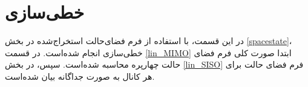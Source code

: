 \section{خطی‌سازی}
در این قسمت، با استفاده از فرم فضای‌حالت استخراج‌شده در بخش 
\ref{spacestate}،
 خطی‌سازی انجام شده‌‌است. در قسمت 
\ref{lin_MIMO}
ابتدا صورت کلی فرم فضای حالت چهارپره محاسبه شده‌است. سپس، در بخش
\ref{lin_SISO}
فرم فضای حالت برای هر کانال به صورت جداگانه بیان شده‌است.
